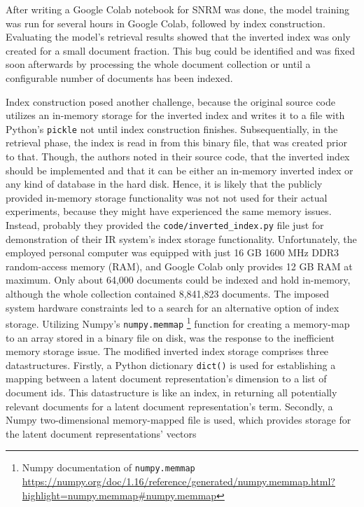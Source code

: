 After writing a Google Colab notebook for SNRM was done, the model training was run for several hours in Google Colab,
    followed by index construction.
Evaluating the model's retrieval results showed that the inverted index was only created for a small document fraction.
This bug could be identified and was fixed soon afterwards by processing the whole document collection or until a
    configurable number of documents has been indexed.

Index construction posed another challenge, because the original source code utilizes an in-memory storage
    for the inverted index and writes it to a file with Python's \texttt{pickle} not until index construction finishes.
Subsequentially, in the retrieval phase, the index is read in from this binary file, that was created prior to that.
Though, the authors noted in their source code, that the inverted index should be implemented and that it can be 
    either an in-memory inverted index or any kind of database in the hard disk.
Hence, it is likely that the publicly provided in-memory storage functionality was not not used for their actual experiments,
    because they might have experienced the same memory issues.
Instead, probably they provided the \verb|code/inverted_index.py| file just for demonstration of their IR system's index
    storage functionality.
Unfortunately, the employed personal computer was equipped with just 16 GB 1600 MHz DDR3 random-access memory (RAM),
    and Google Colab only provides 12 GB RAM at maximum.
Only about 64,000 documents could be indexed and hold in-memory, although the whole collection contained 8,841,823 documents.
The imposed system hardware constraints led to a search for an alternative option of index storage.
Utilizing Numpy's \texttt{numpy.memmap}
    \footnote{Numpy documentation of \texttt{numpy.memmap} \url{https://numpy.org/doc/1.16/reference/generated/numpy.memmap.html?highlight=numpy.memmap\#numpy.memmap}} 
    function for creating a memory-map to an array stored in a binary file on disk, was the response to the 
    inefficient memory storage issue.
The modified inverted index storage comprises three datastructures.
Firstly, a Python dictionary \texttt{dict()} is used for establishing a mapping between a latent document representation's dimension
    to a list of document ids.
This datastructure is like an index, in returning all potentially relevant documents for a latent document representation's term.
Secondly, a Numpy two-dimensional memory-mapped file is used, which provides storage for the latent document representations' vectors
